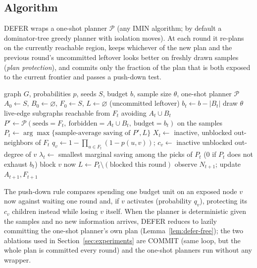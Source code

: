 \documentclass[ijoc,sglanonrev]{informs4}
\begin{document}
\subsection{Algorithm}\label{sec:defer-algo}

DEFER wraps a one-shot planner $\mathcal P$ (any IMIN algorithm; by default
a dominator-tree greedy planner with isolation moves). At each round it
re-plans on the currently reachable region, keeps whichever of the new plan
and the previous round's uncommitted leftover looks better on freshly drawn
samples (\emph{plan protection}), and commits only the fraction of the plan
that is both exposed to the current frontier and passes a push-down test.

\begin{algorithm}[h]
\caption{DEFER}\label{alg:defer}
\begin{algorithmic}[1]
\Require graph $G$, probabilities $p$, seeds $S$, budget $b$, sample size
  $\theta$, one-shot planner $\mathcal P$
\State $A_0\gets S$, $B_0\gets\varnothing$, $F_0\gets S$, $L\gets\varnothing$ (uncommitted leftover)
  \State $b_t\gets b-|B_t|$
  \State draw $\theta$ live-edge subgraphs reachable from $F_t$ avoiding $A_t\cup B_t$
  \State $P'\gets\mathcal P(\text{seeds}=F_t,\ \text{forbidden}=A_t\cup B_t,\ \text{budget}=b_t)$ on the samples
  \State $P_t\gets\arg\max\{\text{sample-average saving of } P', L\}$ 
  \State $X_t\gets$ inactive, unblocked out-neighbors of $F_t$
    \State $q_v\gets 1-\prod_{u\in F_t}(1-p(u,v))$; $c_v\gets$ inactive unblocked out-degree of $v$
    \State $\lambda_t\gets$ smallest marginal saving among the picks of $P_t$ (0 if $P_t$ does not exhaust $b_t$)
     
      \State block $v$ now
    \EndIf
  \EndFor
  \State $L\gets P_t\setminus(\text{blocked this round})$
  \State observe $N_{t+1}$; update $A_{t+1},F_{t+1}$
\EndFor
\end{algorithmic}
\end{algorithm}

The push-down rule compares spending one budget unit on an exposed node $v$
now against waiting one round and, if $v$ activates (probability $q_v$),
protecting its $c_v$ children instead while losing $v$ itself. When the
planner is deterministic given the samples and no new information arrives,
DEFER reduces to lazily committing the one-shot planner's own plan
(Lemma~\ref{lem:defer-free}); the two ablations used in
Section~\ref{sec:experiments} are COMMIT (same loop, but the whole plan is
committed every round) and the one-shot planners run without any wrapper.
\end{document}
